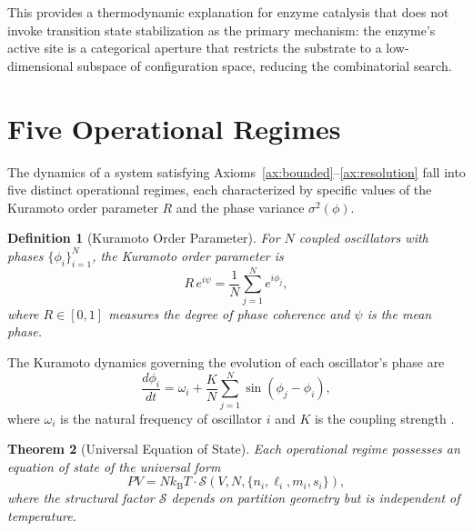 \documentclass[twocolumn,10pt]{article}
\newtheorem{theorem}{Theorem}[section]
\newtheorem{definition}[theorem]{Definition}
\newcommand{\kB}{k_{\mathrm{B}}}
\newcommand{\Rorder}{R}
\begin{document}
This provides a thermodynamic explanation for enzyme catalysis that does not invoke transition state stabilization as the primary mechanism: the enzyme's active site is a categorical aperture that restricts the substrate to a low-dimensional subspace of configuration space, reducing the combinatorial search.

\section{Five Operational Regimes}
\label{sec:regimes}

The dynamics of a system satisfying Axioms~\ref{ax:bounded}--\ref{ax:resolution} fall into five distinct operational regimes, each characterized by specific values of the Kuramoto order parameter $\Rorder$ and the phase variance $\sigma^{2}(\phi)$.

\begin{definition}[Kuramoto Order Parameter]
For $N$ coupled oscillators with phases $\{\phi_{i}\}_{i=1}^{N}$, the Kuramoto order parameter is
\begin{equation}
  \Rorder \, e^{i\psi} = \frac{1}{N} \sum_{j=1}^{N} e^{i\phi_{j}},
  \label{eq:kuramoto_R}
\end{equation}
where $\Rorder \in [0, 1]$ measures the degree of phase coherence and $\psi$ is the mean phase.
\end{definition}

The Kuramoto dynamics governing the evolution of each oscillator's phase are
\begin{equation}
  \frac{d\phi_{i}}{dt} = \omega_{i} + \frac{K}{N} \sum_{j=1}^{N} \sin(\phi_{j} - \phi_{i}),
  \label{eq:kuramoto}
\end{equation}
where $\omega_{i}$ is the natural frequency of oscillator $i$ and $K$ is the coupling strength \citep{kuramoto1984chemical, acebron2005kuramoto}.

\begin{theorem}[Universal Equation of State]
\label{thm:eos}
Each operational regime possesses an equation of state of the universal form
\begin{equation}
  PV = N\kB T \cdot \mathcal{S}(V, N, \{n_{i}, \ell_{i}, m_{i}, s_{i}\}),
  \label{eq:universal_eos}
\end{equation}
where the structural factor $\mathcal{S}$ depends on partition geometry but is independent of temperature.
\end{theorem}
\end{document}
